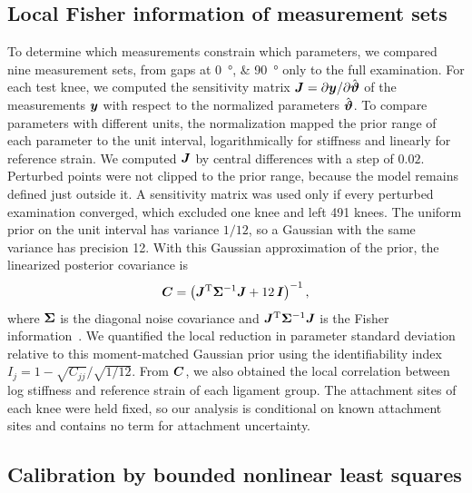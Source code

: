 \subsection{Local Fisher information of measurement sets}

To determine which measurements constrain which parameters, we compared nine measurement sets, from gaps at \SIlist{0;90}{\degree} only to the full examination.
For each test knee, we computed the sensitivity matrix $\mbox{\boldmath $J$}{} = \partial \mbox{\boldmath $y$}{}/\partial \hat{\mbox{\boldmath $\vartheta$}{}}$ of the measurements $\mbox{\boldmath $y$}{}$ with respect to the normalized parameters $\hat{\mbox{\boldmath $\vartheta$}{}}$.
To compare parameters with different units, the normalization mapped the prior range of each parameter to the unit interval, logarithmically for stiffness and linearly for reference strain.
We computed $\mbox{\boldmath $J$}{}$ by central differences with a step of $0.02$.
Perturbed points were not clipped to the prior range, because the model remains defined just outside it.
A sensitivity matrix was used only if every perturbed examination converged, which excluded one knee and left 491 knees.
The uniform prior on the unit interval has variance $1/12$, so a Gaussian with the same variance has precision 12.
With this Gaussian approximation of the prior, the linearized posterior covariance is
\begin{equation}
\mbox{\boldmath $C$}{} = \left(\mbox{\boldmath $J$}{}^\mathrm{T}\mbox{\boldmath $\Sigma$}{}^{-1}\mbox{\boldmath $J$}{} + 12\,\mbox{\boldmath $I$}{}\right)^{-1},
\label{eq:fisher}
\end{equation}
where $\mbox{\boldmath $\Sigma$}{}$ is the diagonal noise covariance and $\mbox{\boldmath $J$}{}^\mathrm{T}\mbox{\boldmath $\Sigma$}{}^{-1}\mbox{\boldmath $J$}{}$ is the Fisher information~\autocite{gutenkunst2007universally,transtrum2015perspective}.
We quantified the local reduction in parameter standard deviation relative to this moment-matched Gaussian prior using the identifiability index $I_j = 1 - \sqrt{C_{jj}}/\sqrt{1/12}$.
From $\mbox{\boldmath $C$}{}$, we also obtained the local correlation between log stiffness and reference strain of each ligament group.
The attachment sites of each knee were held fixed, so our analysis is conditional on known attachment sites and contains no term for attachment uncertainty.

\subsection{Calibration by bounded nonlinear least squares}

